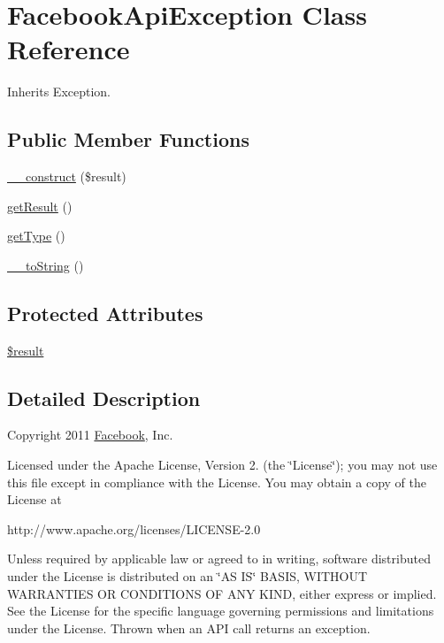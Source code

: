 \hypertarget{class_facebook_api_exception}{\section{Facebook\-Api\-Exception Class Reference}
\label{class_facebook_api_exception}
}


Inherits Exception.

\subsection*{Public Member Functions}
\begin{DoxyCompactItemize}
\item 
\hyperlink{class_facebook_api_exception_a9e40d3c27096359975b952fe04752d19}{\-\_\-\-\_\-construct} (\$result)
\item 
\hyperlink{class_facebook_api_exception_ac6376ad18e5695a4ff443d4b6832f5f1}{get\-Result} ()
\item 
\hyperlink{class_facebook_api_exception_a6b119e3ab23ac69f3f51ee90aee6e688}{get\-Type} ()
\item 
\hyperlink{class_facebook_api_exception_a9c262b52fe807aad1c2770a0ad2ee919}{\-\_\-\-\_\-to\-String} ()
\end{DoxyCompactItemize}
\subsection*{Protected Attributes}
\begin{DoxyCompactItemize}
\item 
\hyperlink{class_facebook_api_exception_a7fb784ca5b949e79541f48d411cea829}{\$result}
\end{DoxyCompactItemize}


\subsection{Detailed Description}
Copyright 2011 \hyperlink{class_facebook}{Facebook}, Inc.

Licensed under the Apache License, Version 2. (the \char`\"{}\-License\char`\"{}); you may not use this file except in compliance with the License. You may obtain a copy of the License at \begin{DoxyVerb}http://www.apache.org/licenses/LICENSE-2.0
\end{DoxyVerb}


Unless required by applicable law or agreed to in writing, software distributed under the License is distributed on an \char`\"{}\-A\-S I\-S\char`\"{} B\-A\-S\-I\-S, W\-I\-T\-H\-O\-U\-T W\-A\-R\-R\-A\-N\-T\-I\-E\-S O\-R C\-O\-N\-D\-I\-T\-I\-O\-N\-S O\-F A\-N\-Y K\-I\-N\-D, either express or implied. See the License for the specific language governing permissions and limitations under the License. Thrown when an A\-P\-I call returns an exception.

